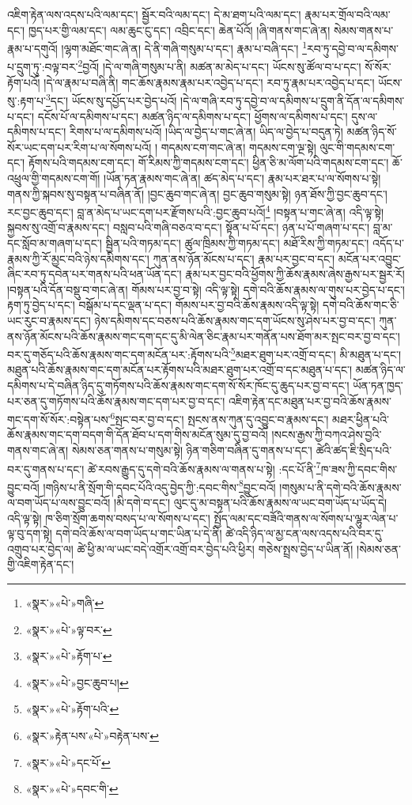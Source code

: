འཇིག་རྟེན་ལས་འདས་པའི་ལམ་དང་། སྦྱོར་བའི་ལམ་དང་། དེ་མ་ཐག་པའི་ལམ་དང་། རྣམ་པར་གྲོལ་བའི་ལམ་དང་། ཁྱད་པར་གྱི་ལམ་དང་། ལམ་ཆུང་ངུ་དང་། འབྲིང་དང་། ཆེན་པོའོ། །ཞི་གནས་གང་ཞེ་ན། སེམས་གནས་པ་རྣམ་པ་དགུའོ། །ལྷག་མཐོང་གང་ཞེ་ན། དེ་ནི་གཞི་གསུམ་པ་དང་། རྣམ་པ་བཞི་དང་། \footnote{«སྣར་»«པེ་»གཞི་}རབ་ཏུ་དབྱེ་བ་ལ་དམིགས་པ་དྲུག་ཏུ་:བལྟ་བར་\footnote{«སྣར་»«པེ་»ལྟ་བར་}བྱའོ། །དེ་ལ་གཞི་གསུམ་པ་ནི། མཚན་མ་མེད་པ་དང་། ཡོངས་སུ་ཚོལ་བ་པ་དང་། སོ་སོར་རྟོག་པའོ། །དེ་ལ་རྣམ་པ་བཞི་ནི། གང་ཆོས་རྣམས་རྣམ་པར་འབྱེད་པ་དང་། རབ་ཏུ་རྣམ་པར་འབྱེད་པ་དང་། ཡོངས་སུ་:རྟག་པ་\footnote{«སྣར་»«པེ་»རྟོག་པ་}དང་། ཡོངས་སུ་དཔྱོད་པར་བྱེད་པའོ། །དེ་ལ་གཞི་རབ་ཏུ་དབྱེ་བ་ལ་དམིགས་པ་དྲུག་ནི་དོན་ལ་དམིགས་པ་དང་། དངོས་པོ་ལ་དམིགས་པ་དང་། མཚན་ཉིད་ལ་དམིགས་པ་དང་། ཕྱོགས་ལ་དམིགས་པ་དང་། དུས་ལ་དམིགས་པ་དང་། རིགས་པ་ལ་དམིགས་པའོ། །ཡིད་ལ་བྱེད་པ་གང་ཞེ་ན། ཡིད་ལ་བྱེད་པ་བདུན་ཏེ། མཚན་ཉིད་སོ་སོར་ཡང་དག་པར་རིག་པ་ལ་སོགས་པའོ། །
གདམས་ངག་གང་ཞེ་ན། གདམས་ངག་ལྔ་སྟེ། ལུང་གི་གདམས་ངག་དང་། རྟོགས་པའི་གདམས་ངག་དང་། གོ་རིམས་ཀྱི་གདམས་ངག་དང་། ཕྱིན་ཅི་མ་ལོག་པའི་གདམས་ངག་དང་། ཆོ་འཕྲུལ་གྱི་གདམས་ངག་གོ། །ཡོན་ཏན་རྣམས་གང་ཞེ་ན། ཚད་མེད་པ་དང་། རྣམ་པར་ཐར་པ་ལ་སོགས་པ་སྟེ། གནས་ཀྱི་སྐབས་སུ་བསྟན་པ་བཞིན་ནོ། །བྱང་ཆུབ་གང་ཞེ་ན། བྱང་ཆུབ་གསུམ་སྟེ། ཉན་ཐོས་ཀྱི་བྱང་ཆུབ་དང་། རང་བྱང་ཆུབ་དང་། བླ་ན་མེད་པ་ཡང་དག་པར་རྫོགས་པའི་:བྱང་ཆུབ་པའོ།\footnote{«སྣར་»«པེ་»བྱང་ཆུབ་པ།} །བསྟན་པ་གང་ཞེ་ན། འདི་ལྟ་སྟེ། སྐྱབས་སུ་འགྲོ་བ་རྣམས་དང་། བསླབ་པའི་གཞི་བཅའ་བ་དང་། སྟོན་པ་པོ་དང་། ཉན་པ་པོ་གཞག་པ་དང་། བླ་མ་དང་སློབ་མ་གཞག་པ་དང་། སྦྱིན་པའི་གཏམ་དང་། ཚུལ་ཁྲིམས་ཀྱི་གཏམ་དང་། མཐོ་རིས་ཀྱི་གཏམ་དང་། འདོད་པ་རྣམས་ཀྱི་རོ་མྱང་བའི་ཉེས་དམིགས་དང་། ཀུན་ནས་ཉོན་མོངས་པ་དང་། རྣམ་པར་བྱང་བ་དང་། མངོན་པར་འབྱུང་ཞིང་རབ་ཏུ་དབེན་པར་གནས་པའི་ཕན་ཡོན་དང་། རྣམ་པར་བྱང་བའི་ཕྱོགས་ཀྱི་ཆོས་རྣམས་ཞེས་རྒྱས་པར་སྦྱར་རོ། །བསྟན་པའི་དོན་བསྡུ་བ་གང་ཞེ་ན། གོམས་པར་བྱ་བ་སྟེ། འདི་ལྟ་སྟེ། དགེ་བའི་ཆོས་རྣམས་ལ་གུས་པར་བྱེད་པ་དང་། རྟག་ཏུ་བྱེད་པ་དང་། བསྒོམ་པ་དང་ལྡན་པ་དང་། གོམས་པར་བྱ་བའི་ཆོས་རྣམས་འདི་ལྟ་སྟེ། དགེ་བའི་ཆོས་གང་ཅི་ཡང་རུང་བ་རྣམས་དང་། ཉེས་དམིགས་དང་བཅས་པའི་ཆོས་རྣམས་གང་དག་ཡོངས་སུ་ཤེས་པར་བྱ་བ་དང་། ཀུན་ནས་ཉོན་མོངས་པའི་ཆོས་རྣམས་གང་དག་དང་དུ་མི་ལེན་ཅིང་རྣམ་པར་གནོན་པས་ཐོག་མར་སྤང་བར་བྱ་བ་དང་། བར་དུ་གཅོད་པའི་ཆོས་རྣམས་གང་དག་མངོན་པར་:རྟོགས་པའི་\footnote{«སྣར་»«པེ་»རྟོག་པའི་}མཐར་ཐུག་པར་འགྲོ་བ་དང་། མི་མཐུན་པ་དང་། མཐུན་པའི་ཆོས་རྣམས་གང་དག་མངོན་པར་རྟོགས་པའི་མཐར་ཐུག་པར་འགྲོ་བ་དང་མཐུན་པ་དང་། མཚན་ཉིད་ལ་དམིགས་པ་དེ་བཞིན་ཉིད་དུ་གཏོགས་པའི་ཆོས་རྣམས་གང་དག་སོ་སོར་ཁོང་དུ་ཆུད་པར་བྱ་བ་དང་། ཡོན་ཏན་ཁྱད་པར་ཅན་དུ་གཏོགས་པའི་ཆོས་རྣམས་གང་དག་པར་བྱ་བ་དང་། འཇིག་རྟེན་དང་མཐུན་པར་བྱ་བའི་ཆོས་རྣམས་གང་དག་སོ་སོར་:བསྟེན་པས་\footnote{«སྣར་»རྟེན་པས་«པེ་»བརྟེན་པས་}སྤང་བར་བྱ་བ་དང་། སྤངས་ནས་ཀུན་དུ་འབྱུང་བ་རྣམས་དང་། མཐར་ཕྱིན་པའི་ཆོས་རྣམས་གང་དག་བདག་གི་དོན་ཐོབ་པ་དག་གིས་མངོན་སུམ་དུ་བྱ་བའོ། །སངས་རྒྱས་ཀྱི་བཀའ་ཤེས་བྱའི་གནས་གང་ཞེ་ན། སེམས་ཅན་གནས་པ་གསུམ་སྟེ། ཉིན་གཅིག་བཞིན་དུ་གནས་པ་དང་། ཚེའི་ཚད་ཇི་སྲིད་པའི་བར་དུ་གནས་པ་དང་། ཚེ་རབས་རྒྱུད་དུ་དགེ་བའི་ཆོས་རྣམས་ལ་གནས་པ་སྟེ། :དང་པོ་ནི་\footnote{«སྣར་»«པེ་»དང་པོ་}ཁ་ཟས་ཀྱི་དབང་གིས་བྱུང་བའོ། །གཉིས་པ་ནི་སྲོག་གི་དབང་པོའི་འདུ་བྱེད་ཀྱི་:དབང་གིས་\footnote{«སྣར་»«པེ་»དབང་གི་}བྱུང་བའོ། །གསུམ་པ་ནི་དགེ་བའི་ཆོས་རྣམས་ལ་བག་ཡོད་པ་ལས་བྱུང་བའོ། །མི་དགེ་བ་དང་། ལུང་དུ་མ་བསྟན་པའི་ཆོས་རྣམས་ལ་ཡང་བག་ཡོད་པ་ཡོད་དེ། འདི་ལྟ་སྟེ། ཁ་ཅིག་སྲོག་ཆགས་བསད་པ་ལ་སོགས་པ་དང་། སྤྱོད་ལམ་དང་བཟོའི་གནས་ལ་སོགས་པ་ལྷུར་ལེན་པ་ལྟ་བུ་དག་སྟེ། དགེ་བའི་ཆོས་ལ་བག་ཡོད་པ་གང་ཡིན་པ་དེ་ནི། ཚེ་འདི་ཉིད་ལ་མྱ་ངན་ལས་འདས་པའི་བར་དུ་འགྲུབ་པར་བྱེད་ལ། ཚེ་ཕྱི་མ་ལ་ཡང་བདེ་འགྲོར་འགྲོ་བར་བྱེད་པའི་ཕྱིར། གཅེས་སྤྲས་བྱེད་པ་ཡིན་ནོ། །སེམས་ཅན་གྱི་འཇིག་རྟེན་དང་། 